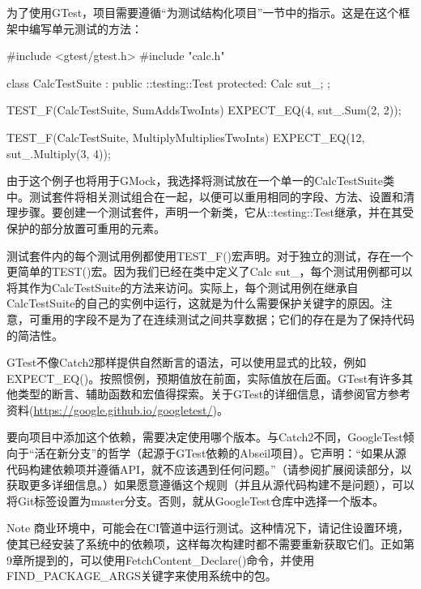
为了使用GTest，项目需要遵循“为测试结构化项目”一节中的指示。这是在这个框架中编写单元测试的方法：


\begin{cpp}
#include <gtest/gtest.h>
#include "calc.h"

class CalcTestSuite : public ::testing::Test {
    protected:
    Calc sut_;
};

TEST_F(CalcTestSuite, SumAddsTwoInts) {
    EXPECT_EQ(4, sut_.Sum(2, 2));
}

TEST_F(CalcTestSuite, MultiplyMultipliesTwoInts) {
    EXPECT_EQ(12, sut_.Multiply(3, 4));
}
\end{cpp}

由于这个例子也将用于GMock，我选择将测试放在一个单一的CalcTestSuite类中。测试套件将相关测试组合在一起，以便可以重用相同的字段、方法、设置和清理步骤。要创建一个测试套件，声明一个新类，它从::testing::Test继承，并在其受保护的部分放置可重用的元素。

测试套件内的每个测试用例都使用TEST\_F()宏声明。对于独立的测试，存在一个更简单的TEST()宏。因为我们已经在类中定义了Calc sut\_，每个测试用例都可以将其作为CalcTestSuite的方法来访问。实际上，每个测试用例在继承自CalcTestSuite的自己的实例中运行，这就是为什么需要保护关键字的原因。注意，可重用的字段不是为了在连续测试之间共享数据；它们的存在是为了保持代码的简洁性。

GTest不像Catch2那样提供自然断言的语法，可以使用显式的比较，例如EXPECT\_EQ()。按照惯例，预期值放在前面，实际值放在后面。GTest有许多其他类型的断言、辅助函数和宏值得探索。关于GTest的详细信息，请参阅官方参考资料(\url{https://google.github.io/googletest/})。

要向项目中添加这个依赖，需要决定使用哪个版本。与Catch2不同，GoogleTest倾向于“活在新分支”的哲学（起源于GTest依赖的Abseil项目）。它声明：“如果从源代码构建依赖项并遵循API，就不应该遇到任何问题。”（请参阅扩展阅读部分，以获取更多详细信息。）如果愿意遵循这个规则（并且从源代码构建不是问题），可以将Git标签设置为master分支。否则，就从GoogleTest仓库中选择一个版本。

\begin{myNotic}{Note}
商业环境中，可能会在CI管道中运行测试。这种情况下，请记住设置环境，使其已经安装了系统中的依赖项，这样每次构建时都不需要重新获取它们。正如第9章所提到的，可以使用FetchContent\_Declare()命令，并使用FIND\_PACKAGE\_ARGS关键字来使用系统中的包。
\end{myNotic}

